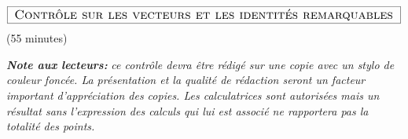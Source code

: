 \documentclass[a4paper,10.9pt]{article}
\theoremstyle{definition}
\begin{document}

\chead{}\renewcommand{\headrulewidth}{0.4pt}\renewcommand{\footrulewidth}{0.4pt}

\hfill\\[-0.7cm]
$$	\fbox{\text{\Large{ \sc Contrôle sur les vecteurs et les identités remarquables }}}$$
\centering \Large{ (55 minutes) }\\[0.5cm]

\flushleft\normalsize


\textbf{\textit{Note aux lecteurs:}} \textit{ce contrôle devra être rédigé sur une copie avec un stylo de couleur foncée. La présentation et la qualité de rédaction seront un facteur important d'appréciation des copies.  Les calculatrices sont autorisées mais un résultat sans l'expression des calculs qui lui est associé ne rapportera pas la totalité des points.}\\[0.7cm]	
\end{document}
